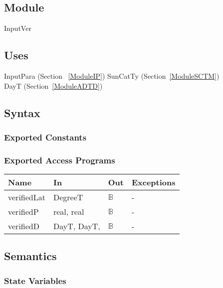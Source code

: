 \documentclass[12pt, titlepage]{article}
\begin{document}
\subsection{Module}
InputVer

\subsection{Uses}
InputPara (Section ~\ref{ModuleIP})
SunCatTy (Section~\ref{ModuleSCTM}) \\
DayT (Section~\ref{ModuleADTD}) \\

\subsection{Syntax}

\subsubsection{Exported Constants}


\subsubsection{Exported Access Programs}

\begin{center}
\begin{tabular}{p{2cm} p{5cm} p{2cm} p{5cm}}
\hline
\textbf{Name} & \textbf{In} & \textbf{Out} & \textbf{Exceptions} \\
\hline 
verifiedLat & DegreeT& $\mathbb{B}$ & - \\
verifiedP &  real, real & $\mathbb{B}$ & - \\
verifiedD & DayT, DayT, & $\mathbb{B}$ & - \\
\hline
\end{tabular}
\end{center}


\subsection{Semantics}

\subsubsection{State Variables}
\end{document}
